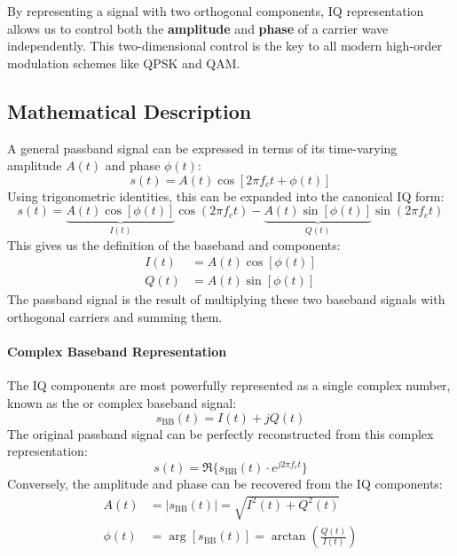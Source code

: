 \begin{keyconcept}
    By representing a signal with two orthogonal components, IQ representation allows us to control both the \textbf{amplitude} and \textbf{phase} of a carrier wave independently. This two-dimensional control is the key to all modern high-order modulation schemes like QPSK and QAM.
\end{keyconcept}


\subsection{Mathematical Description}

A general passband signal can be expressed in terms of its time-varying amplitude $A(t)$ and phase $\phi(t)$:
\begin{equation}
    s(t) = A(t) \cos[2\pi f_c t + \phi(t)]
\end{equation}
Using trigonometric identities, this can be expanded into the canonical IQ form:
\begin{equation}
    s(t) = \underbrace{A(t)\cos[\phi(t)]}_{I(t)} \cos(2\pi f_c t) - \underbrace{A(t)\sin[\phi(t)]}_{Q(t)} \sin(2\pi f_c t)
\end{equation}
This gives us the definition of the baseband  and  components:
\begin{align}
    I(t) &= A(t)\cos[\phi(t)] \\
    Q(t) &= A(t)\sin[\phi(t)]
\end{align}
The passband signal is the result of multiplying these two baseband signals with orthogonal carriers and summing them.

\paragraph{Complex Baseband Representation}
The IQ components are most powerfully represented as a single complex number, known as the  or complex baseband signal:
\begin{equation}
    s_{\text{BB}}(t) = I(t) + jQ(t)
\end{equation}
The original passband signal can be perfectly reconstructed from this complex representation:
\begin{equation}
    s(t) = \Re\{s_{\text{BB}}(t) \cdot e^{j2\pi f_c t}\}
\end{equation}
Conversely, the amplitude and phase can be recovered from the IQ components:
\begin{align}
    A(t) &= |s_{\text{BB}}(t)| = \sqrt{I^2(t) + Q^2(t)} \\
    \phi(t) &= \arg[s_{\text{BB}}(t)] = \arctan\left(\frac{Q(t)}{I(t)}\right)
\end{align}


